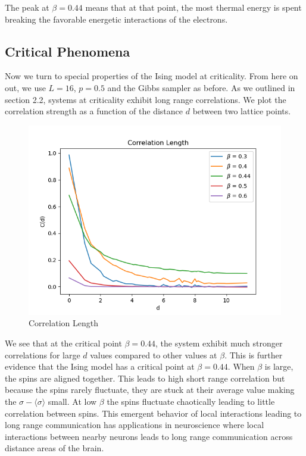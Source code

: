 \documentclass{article}
\begin{document}
The peak at $\beta=0.44$ means that at that point, the most thermal energy is spent breaking the favorable energetic interactions of the
electrons.

\subsection{Critical Phenomena}
Now we turn to special properties of the Ising model at criticality. From here on out, we use $L=16$, $p=0.5$ and the Gibbs sampler as before. As we outlined in section 2.2, systems at criticality
exhibit long range correlations. We plot the correlation strength as a function of the distance $d$ between
two lattice points. 

\begin{figure}[ht]
    \includegraphics[width=\columnwidth]{plots/corr_len.png}
    \caption{Correlation Length}
    \label{fig:5}
\end{figure}
We see that at the critical point $\beta = 0.44$, the system exhibit much stronger correlations for large $d$ values
compared to other values at $\beta$. This is further evidence that the Ising model has a critical point at $\beta = 0.44$.
When $\beta$ is large, the spins are aligned together. This leads to high short range correlation but because the spins rarely fluctuate, 
they are stuck at their average value making the $\sigma - \langle \sigma \rangle$ small. At low $\beta$ the spins fluctuate chaotically 
leading to little correlation between spins. This emergent behavior of local interactions leading to long range communication has applications in
neuroscience where local interactions between nearby neurons leads to long range communication across distance areas of the brain.
\end{document}

